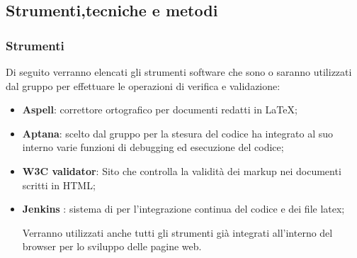 
\subsection{Strumenti,tecniche e metodi}

\subsubsection{Strumenti}

Di seguito verranno elencati gli strumenti software che sono o saranno utilizzati dal gruppo per effettuare le operazioni di verifica e validazione:
\begin{itemize}

\item \textbf{Aspell}: correttore ortografico per documenti redatti in \LaTeX;

\item \textbf{Aptana}: scelto dal gruppo per la stesura del codice ha integrato al suo interno varie funzioni di debugging ed esecuzione del codice;

\item \textbf{W3C validator}: Sito che controlla la validità dei markup nei documenti scritti in HTML;

\item \textbf{Jenkins} : sistema di per l'integrazione continua del codice e dei file latex;

Verranno utilizzati anche tutti gli strumenti già integrati all'interno del browser per lo sviluppo delle pagine web.

\end{itemize}
